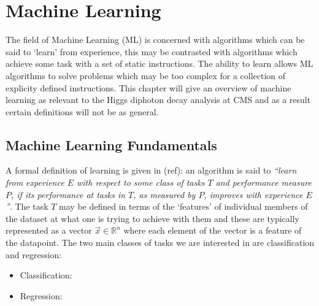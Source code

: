 \chapter{Machine Learning}
\label{chap:machine_learning}


\newpage

The field of Machine Learning (ML) is concerned with algorithms which can be said to `learn' from experience, this may be contrasted with algorithms which achieve some task with a set of static instructions. The ability to learn allows ML algorithms to solve problems which may be too complex for a collection of explicity defined instructions. 
This chapter will give an overview of machine learning as relevant to the Higgs diphoton decay analysis at CMS and as a result certain definitions will not be as general. 

\section{Machine Learning Fundamentals}

A formal definition of learning is given in (ref): an algorithm is said to \textit{``learn from experience $E$ with respect to some class of tasks $T$ and performance measure $P$, if its performance at tasks in $T$, as measured by $P$, improves with experience $E$''}. 
The task $T$ may be defined in terms of the `features' of individual members of the dataset at what one is trying to achieve with them and these are typically represented as a vector $\vec{x}\in\mathbb{R}^{n}$ where each element of the vector is a feature of the datapoint. The two main classes of tasks we are interested in are classification and regression:
\begin{itemize}[leftmargin=.5in,noitemsep]
    \item Classification:
    \item Regression:
\end{itemize}

